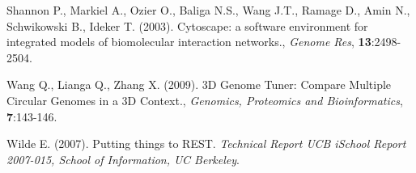 \documentclass{bioinfo}
\begin{document}
\begin{thebibliography}{}
 Shannon P., Markiel A., Ozier O., Baliga N.S., Wang J.T., Ramage D., Amin N., Schwikowski B., Ideker T. (2003). Cytoscape: a software environment for integrated models of biomolecular interaction networks., {\it Genome Res}, {\bf{13}}:2498-2504.

 Wang Q., Lianga Q., Zhang X. (2009). 3D Genome Tuner: Compare Multiple Circular Genomes in a 3D Context., {\it Genomics, Proteomics and Bioinformatics}, {\bf{7}}:143-146.

 Wilde E. (2007). Putting things to REST. {\it Technical Report UCB iSchool Report 2007-015, School of Information, UC Berkeley}.

\end{thebibliography}
\end{document}
